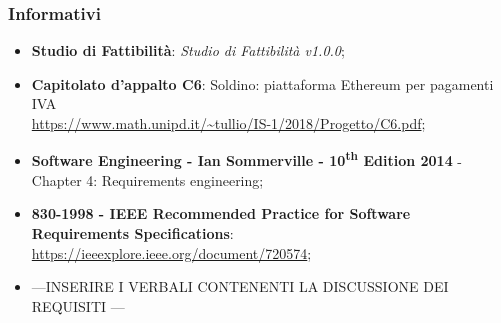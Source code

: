 \subsubsection{Informativi}
\begin{itemize}
	\item \textbf{Studio di Fattibilità}: \textit{Studio di Fattibilità v1.0.0};
	\item \textbf{Capitolato d'appalto C6}: Soldino: piattaforma Ethereum per pagamenti IVA \\ \textsf{\url{ https://www.math.unipd.it/~tullio/IS-1/2018/Progetto/C6.pdf}};
	\item \textbf{Software Engineering - Ian Sommerville - 10\textsuperscript{th} Edition 2014}
	\subitem - Chapter 4: Requirements engineering;
	\item \textbf{830-1998 - IEEE Recommended Practice for Software Requirements Specifications}: \textsf{\url{https://ieeexplore.ieee.org/document/720574}};
	\item ---INSERIRE I VERBALI CONTENENTI LA DISCUSSIONE DEI REQUISITI ---
	
\end{itemize}